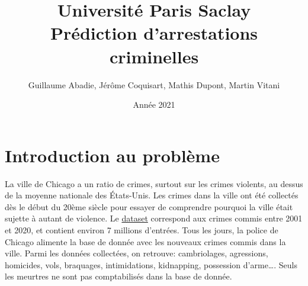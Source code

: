 \documentclass{article}
\title{\textbf{\Huge  Université Paris Saclay}\\ Prédiction d'arrestations criminelles}
\author{Guillaume Abadie, Jérôme Coquisart, Mathis Dupont, Martin Vitani}
\date{Année 2021}
\begin{document}
    \maketitle
    \tableofcontents

    \section{Introduction au problème}
    La ville de Chicago a un ratio de crimes, surtout sur les crimes violents,
    au dessus de la moyenne nationale des États-Unis.
    Les crimes dans la ville ont été collectés dès le début du 20ème siècle pour
    essayer de comprendre pourquoi la ville était sujette à autant de violence.
    Le \href{https://www.kaggle.com/n3v375/chicago-crime-from-01jan2001-to-22jul2020}{dataset} correspond aux crimes commis entre 2001 et 2020, et contient environ 
    7 millions d'entrées.
    Tous les jours, la police de Chicago alimente la base de donnée avec les
    nouveaux crimes commis dans la ville. 
    Parmi les données collectées, on retrouve: 
    cambriolages, agressions, homicides, vols, braquages, intimidations, kidnapping, 
    possession d'arme\dots.
    Seuls les meurtres ne sont pas comptabilisés dans la base de donnée.
\end{document}
